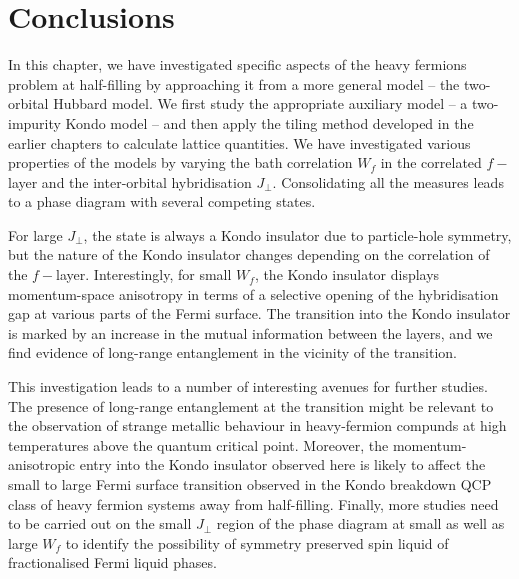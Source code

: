 \section{Conclusions}
In this chapter, we have investigated specific aspects of the heavy fermions problem at half-filling by approaching it from a more general model -- the two-orbital Hubbard model. We first study the appropriate auxiliary model -- a two-impurity Kondo model -- and then apply the tiling method developed in the earlier chapters to calculate lattice quantities. We have investigated various properties of the models by varying the bath correlation \(W_f\) in the correlated \(f-\)layer and the inter-orbital hybridisation \(J_\perp\). Consolidating all the measures leads to a phase diagram with several competing states.

For large \(J_\perp\), the state is always a Kondo insulator due to particle-hole symmetry, but the nature of the Kondo insulator changes depending on the correlation of the \(f-\)layer. Interestingly, for small \(W_f\), the Kondo insulator displays momentum-space anisotropy in terms of a selective opening of the hybridisation gap at various parts of the Fermi surface. The transition into the Kondo insulator is marked by an increase in the mutual information between the layers, and we find evidence of long-range entanglement in the vicinity of the transition.

This investigation leads to a number of interesting avenues for further studies. The presence of long-range entanglement at the transition might be relevant to the observation of strange metallic behaviour in heavy-fermion compunds at high temperatures above the quantum critical point. Moreover, the momentum-anisotropic entry into the Kondo insulator observed here is likely to affect the small to large Fermi surface transition observed in the Kondo breakdown QCP class of heavy fermion systems away from half-filling. Finally, more studies need to be carried out on the small \(J_\perp\) region of the phase diagram at small as well as large \(W_f\) to identify the possibility of symmetry preserved spin liquid of fractionalised Fermi liquid phases.

